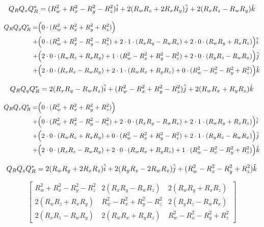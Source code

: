 \begin{align*}
Q_RQ_xQ_R^* =
	   (R_w^2 + R_x^2 - R_y^2 - R_z^2)\hat{\textcolor{black}{i}}
	+ 2(R_wR_z + 2R_xR_y)\hat{\textcolor{black}{j}}
	+ 2(R_xR_z - R_wR_y)\hat{\textcolor{black}{k}}
\end{align*}

\begin{align*}
Q_RQ_yQ_R^* =
	&\Big(
	 0 \cdot (R_w^2 + R_x^2 + R_y^2 + R_z^2)
	\Big)\\
	+&\Big(
	           0 \cdot (R_w^2 + R_x^2 - R_y^2 - R_z^2)
	 + 2 \cdot 1 \cdot (R_xR_y - R_wR_z)
	 + 2 \cdot 0 \cdot (R_wR_y + R_xR_z)
	\Big)\hat{\textcolor{black}{i}}\\
	+&\Big(
	   2 \cdot 0 \cdot (R_wR_z + R_xR_y)
	 +         1 \cdot (R_w^2 - R_x^2 + R_y^2 - R_z^2)
	 + 2 \cdot 0 \cdot (R_yR_z - R_wR_x)
	\Big)\hat{\textcolor{black}{j}}\\
	+&\Big(
	   2 \cdot 0 \cdot (R_xR_z - R_wR_y)
	 + 2 \cdot 1 \cdot (R_wR_x + R_yR_z)
	 +         0 \cdot (R_w^2 - R_x^2 - R_y^2 + R_z^2)
	\Big)\hat{\textcolor{black}{k}}
\end{align*}

\begin{align*}
Q_RQ_yQ_R^* =
	  2(R_xR_y - R_wR_z)\hat{\textcolor{black}{i}}
	+  (R_w^2 - R_x^2 + R_y^2 - R_z^2)\hat{\textcolor{black}{j}}
	+ 2(R_wR_x + R_yR_z)\hat{\textcolor{black}{k}}
\end{align*}

\begin{align*}
Q_RQ_zQ_R^* =
	&\Big(
	 0 \cdot (R_w^2 + R_x^2 + R_y^2 + R_z^2)
	\Big)\\
	+&\Big(
	           0 \cdot (R_w^2 + R_x^2 - R_y^2 - R_z^2)
	 + 2 \cdot 0 \cdot (R_xR_y - R_wR_z)
	 + 2 \cdot 1 \cdot (R_wR_y + R_xR_z)
	\Big)\hat{\textcolor{black}{i}}\\
	+&\Big(
	   2 \cdot 0 \cdot (R_wR_z + R_xR_y)
	 +         0 \cdot (R_w^2 - R_x^2 + R_y^2 - R_z^2)
	 + 2 \cdot 1 \cdot (R_yR_z - R_wR_x)
	\Big)\hat{\textcolor{black}{j}}\\
	+&\Big(
	   2 \cdot 0 \cdot (R_xR_z - R_wR_y)
	 + 2 \cdot 0 \cdot (R_wR_x + R_yR_z)
	 +         1 \cdot (R_w^2 - R_x^2 - R_y^2 + R_z^2)
	\Big)\hat{\textcolor{black}{k}}
\end{align*}

\begin{align*}
Q_RQ_zQ_R^* =
	  2(R_wR_y + 2R_xR_z)\hat{\textcolor{black}{i}}
	+ 2(R_yR_z - 2R_wR_x)\hat{\textcolor{black}{j}}
	+  (R_w^2 - R_x^2 - R_y^2 + R_z^2)\hat{\textcolor{black}{k}}
\end{align*}

$$
\begin{bmatrix}
R_w^2 + R_x^2 - R_y^2 - R_z^2 & 2(R_xR_y - R_wR_z) & 2(R_wR_y + R_xR_z)\\
2(R_wR_z + R_xR_y) & R_w^2 - R_x^2 + R_y^2 - R_z^2 & 2(R_yR_z - R_wR_x)\\
2(R_xR_z - R_wR_y) & 2(R_wR_x + R_yR_z) & R_w^2 - R_x^2 - R_y^2 + R_z^2
\end{bmatrix}
$$